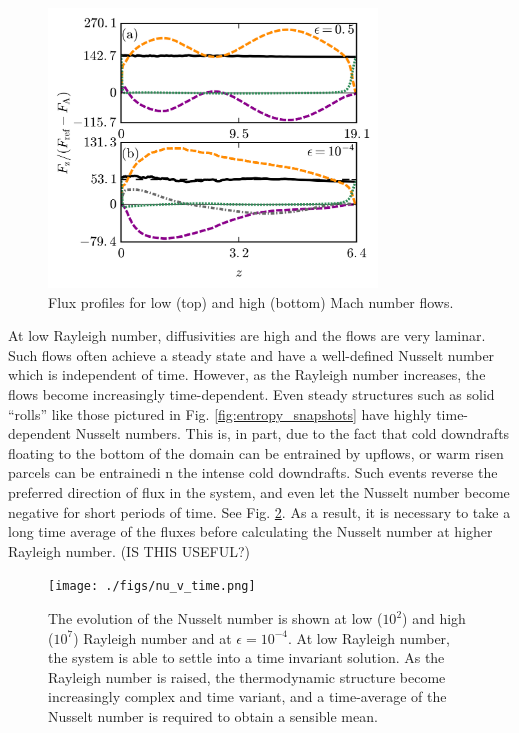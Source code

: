 \documentclass[aps, prl, twocolumn, groupedaddress]{revtex4-1}
\begin{document}
\begin{figure}[b]
\includegraphics[width=3.4375in]{./figs/fluxes_fig.png}
\caption{Flux profiles for low (top) and high (bottom) Mach number flows.  
\label{fig:flux_profiles} }
\end{figure}

At low Rayleigh number, diffusivities are high and the flows are very laminar.  Such flows often achieve a
steady state and have a well-defined Nusselt number which is independent of time.  However, as the Rayleigh
number increases, the flows become increasingly time-dependent.  Even steady structures such as solid
``rolls'' like those pictured in Fig. \ref{fig:entropy_snapshots} have highly time-dependent Nusselt numbers.
This is, in part, due to the fact that cold downdrafts floating to the bottom of the domain can be entrained
by upflows, or warm risen parcels can be entrainedi n the intense cold downdrafts.  Such events reverse the
preferred direction of flux in the system, and even let the Nusselt number become negative for short periods of
time.  See Fig. \ref{fig:nu_v_time}.  As a result, it is necessary to take a long time average of the fluxes
before calculating the Nusselt number at higher Rayleigh number. (IS THIS USEFUL?)


\begin{figure}[t]
\texttt{[image: ./figs/nu\_v\_time.png]}
\caption{The evolution of the Nusselt number is shown at low ($10^2$) and high ($10^7$) Rayleigh number and at
$\epsilon = 10^{-4}$.  At low Rayleigh number, the system is able to settle into a time invariant solution. As
the Rayleigh number is raised, the thermodynamic structure become increasingly complex and time variant, and a
time-average of the Nusselt number is required to obtain a sensible mean.
\label{fig:nu_v_time} }
\end{figure}
\end{document}

